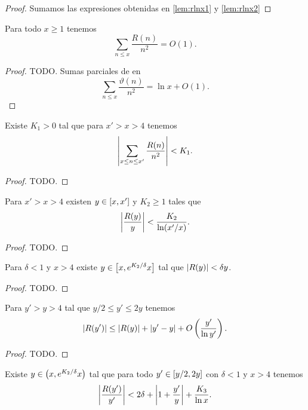 \begin{proof}
    Sumamos las expresiones obtenidas en \cref{lem:rlnx1} y \cref{lem:rlnx2}
\end{proof}

\begin{lemma}
    Para todo \(x \geq 1\) tenemos
    \[
        \sum_{n \leq x} \frac{R(n)}{n^2} = O(1).    
    \]
\end{lemma}

\begin{proof}
    TODO.
    Sumas parciales de \cite[teorema 2]{Mertens1874} en
    \[
        \sum_{n \leq x} \frac{\vartheta(n)}{n^2} = \ln x + O(1).
    \]
\end{proof}

\begin{lemma}
    Existe \(K_1 > 0\) tal que para \(x' > x > 4\) tenemos
    \[
        \left\lvert \sum_{x \leq n \leq x'} \frac{R(n)}{n^2} \right\rvert < K_1.
    \]
\end{lemma}

\begin{proof}
    TODO.
\end{proof}

\begin{lemma}
    Para \(x' > x > 4\) existen \(y \in \left[ x, x' \right]\)
    y \(K_2 \geq 1\) tales que
    \[
        \left\lvert \frac{R(y)}{y} \right\rvert < \frac{K_2}{\ln(x'/x)}.
    \]
\end{lemma}

\begin{proof}
    TODO.
\end{proof}

\begin{lemma}
    Para \(\delta < 1\) y \(x > 4\) existe
    \(y \in \left[ x, e^{K_2 / \delta} x \right]\) tal que
    \(\left\lvert R(y) \right\rvert < \delta y\).
\end{lemma}

\begin{proof}
    TODO.
\end{proof}

\begin{lemma}
    Para \(y' > y > 4\) tal que \(y/2 \leq y' \leq 2y\) tenemos
    \[
        \left\lvert R(y') \right\rvert \leq \left\lvert R(y) \right\rvert + \left\lvert y' - y \right\rvert + O\left( \frac{y'}{\ln y'} \right).    
    \]
\end{lemma}

\begin{proof}
    TODO.
\end{proof}

\begin{lemma}
    Existe \(y \in \left( x, e^{K_2/\delta}x \right)\) tal que
    para todo \(y' \in \left[ y/2, 2y \right]\) con
    \(\delta < 1\) y \(x > 4\) tenemos
    \[
        \left\lvert \frac{R(y')}{y'} \right\rvert < 2\delta + \left\lvert 1 + \frac{y'}{y} \right\rvert + \frac{K_3}{\ln x}.
    \]
\end{lemma}

